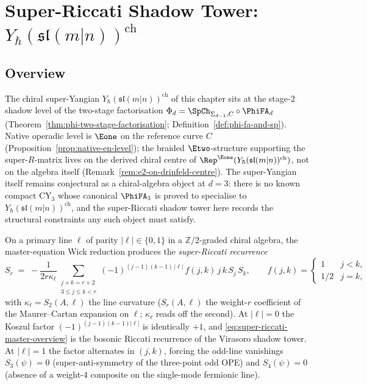 
\chapter{Super-Riccati Shadow Tower: \texorpdfstring{$Y_\hbar(\mathfrak{sl}(m|n))^{\mathrm{ch}}$}{Y-hbar(sl(m|n))-ch}}
\label{ch:super-riccati-shadow-tower-platonic}

\providecommand{\cW}{\mathcal{W}}
\providecommand{\str}{\mathrm{str}}
\providecommand{\sdim}{\mathrm{sdim}}

\section*{Overview}
\label{sec:super-riccati-overview}

The chiral super-Yangian $Y_\hbar(\mathfrak{sl}(m|n))^{\mathrm{ch}}$ of
this chapter sits at the stage-$2$ shadow level of the two-stage
factorisation $\Phi_d = \SpCh_{\Sigma_{d - 1}, C} \circ \PhiFA_d$
(Theorem~\ref{thm:phi-two-stage-factorisation};
Definition~\ref{def:phi-fa-and-sp}). Native operadic level is $\Eone$ on
the reference curve $C$ (Proposition~\ref{prop:native-en-level}); the
braided $\Etwo$-structure supporting the super-$R$-matrix lives on the
derived chiral centre of $\Rep^{\Eone}(Y_\hbar(\mathfrak{sl}(m|n))^{\mathrm{ch}})$,
not on the algebra itself
(Remark~\ref{rem:e2-on-drinfeld-centre}). The super-Yangian itself
remains conjectural as a chiral-algebra object at $d = 3$: there is no
known compact CY$_3$ whose canonical $\PhiFA_3$ is proved to specialise
to $Y_\hbar(\mathfrak{sl}(m|n))^{\mathrm{ch}}$, and the super-Riccati
shadow tower here records the structural constraints any such object
must satisfy.

On a primary line $\ell$ of parity $|\ell| \in \{0, 1\}$ in a
$\mathbb{Z}/2$-graded chiral algebra, the master-equation Wick
reduction produces the \emph{super-Riccati recurrence}
\begin{equation}
\label{eq:super-riccati-master-overview}
S_r \;=\; -\frac{1}{2 r \kappa_\ell}
\sum_{\substack{j + k = r + 2 \\ 3 \le j \le k < r}}
(-1)^{(j - 1)(k - 1)\,|\ell|}\, f(j, k)\, j\,k\, S_j\, S_k,
\qquad
f(j,k) = \begin{cases} 1 & j < k, \\ 1/2 & j = k, \end{cases}
\end{equation}
with $\kappa_\ell = S_2(A, \ell)$ the line curvature ($S_r(A, \ell)$
the weight-$r$ coefficient of the Maurer--Cartan expansion on
$\ell$; $\kappa_\ell$ reads off the second). At $|\ell| = 0$ the
Koszul factor $(-1)^{(j-1)(k-1)|\ell|}$ is identically $+1$, and
\eqref{eq:super-riccati-master-overview} is the bosonic Riccati
recurrence of the Virasoro shadow tower. At $|\ell| = 1$ the factor
alternates in $(j, k)$, forcing the odd-line vanishings $S_3(\psi)
= 0$ (super-anti-symmetry of the three-point odd OPE) and
$S_4(\psi) = 0$ (absence of a weight-$4$ composite on the
single-mode fermionic line).

